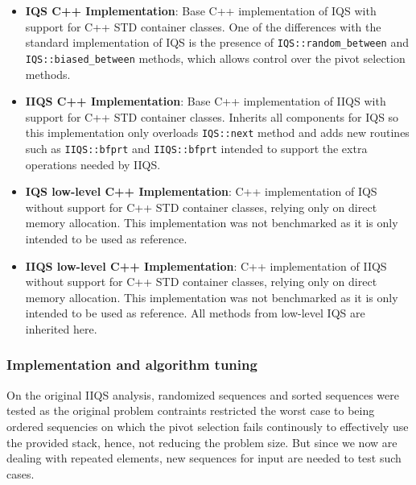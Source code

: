 \begin{itemize}
    \item{
        \textbf{IQS C++ Implementation}: Base C++ implementation of IQS with support for C++ STD container classes. One of the differences with the standard implementation of IQS is the presence of \texttt{IQS::random\_between} and \texttt{IQS::biased\_between} methods, which allows control over the pivot selection methods.
    }
    \item{
        \textbf{IIQS C++ Implementation}: Base C++ implementation of IIQS with support for C++ STD container classes. Inherits all components for IQS so this implementation only overloads \texttt{IQS::next} method and adds new routines such as \texttt{IIQS::bfprt} and \texttt{IIQS::bfprt} intended to support the extra operations needed by IIQS.
    }
    \item{
        \textbf{IQS low-level C++ Implementation}: C++ implementation of IQS without support for C++ STD container classes, relying only on direct memory allocation. This implementation was not benchmarked as it is only intended to be used as reference.
    }
    \item{
        \textbf{IIQS low-level C++ Implementation}: C++ implementation of IIQS without support for C++ STD container classes, relying only on direct memory allocation. This implementation was not benchmarked as it is only intended to be used as reference. All methods from low-level IQS are inherited here.
    }
\end{itemize}

\subsubsection{Implementation and algorithm tuning}
On the original IIQS analysis, randomized sequences and sorted sequences were tested as the original problem contraints restricted the worst case to being ordered sequencies on which the pivot selection fails continously to effectively use the provided stack, hence, not reducing the problem size. But since we now are dealing with repeated elements, new sequences for input are needed to test such cases.


